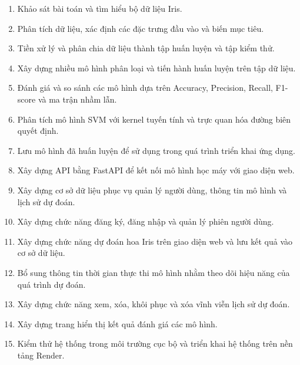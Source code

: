 \documentclass[14pt]{extarticle}
\begin{document}
		   \begin{enumerate}
		   	\item Khảo sát bài toán và tìm hiểu bộ dữ liệu Iris.
		   	
		   	\item Phân tích dữ liệu, xác định các đặc trưng đầu vào và biến mục tiêu.
		   	
		   	\item Tiền xử lý và phân chia dữ liệu thành tập huấn luyện và tập kiểm thử.
		   	
		   	\item Xây dựng nhiều mô hình phân loại và tiến hành huấn luyện trên tập dữ liệu.
		   	
		   	\item Đánh giá và so sánh các mô hình dựa trên Accuracy, Precision, Recall, F1-score và ma trận nhầm lẫn.
		   	
		   	\item Phân tích mô hình SVM với kernel tuyến tính và trực quan hóa đường biên quyết định.
		   	
		   	\item Lưu mô hình đã huấn luyện để sử dụng trong quá trình triển khai ứng dụng.
		   	
		   	\item Xây dựng API bằng FastAPI để kết nối mô hình học máy với giao diện web.
		   	
		   	\item Xây dựng cơ sở dữ liệu phục vụ quản lý người dùng, thông tin mô hình và lịch sử dự đoán.
		   	
		   	\item Xây dựng chức năng đăng ký, đăng nhập và quản lý phiên người dùng.
		   	
		   	\item Xây dựng chức năng dự đoán hoa Iris trên giao diện web và lưu kết quả vào cơ sở dữ liệu.
		   	
		   	\item Bổ sung thông tin thời gian thực thi mô hình nhằm theo dõi hiệu năng của quá trình dự đoán.
		   	
		   	\item Xây dựng chức năng xem, xóa, khôi phục và xóa vĩnh viễn lịch sử dự đoán.
		   	
		   	\item Xây dựng trang hiển thị kết quả đánh giá các mô hình.
		   	
		   	\item Kiểm thử hệ thống trong môi trường cục bộ và triển khai hệ thống trên nền tảng Render.
		   	
		   \end{enumerate}
		   
\end{document}
